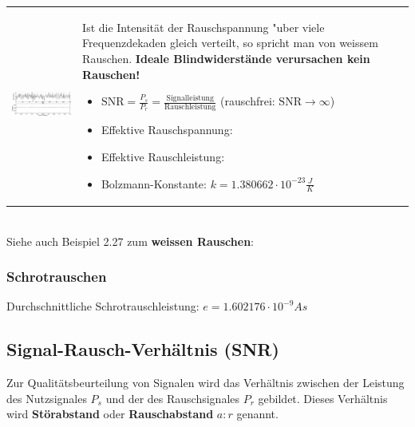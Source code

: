 		\begin{tabularx}{\textwidth}{lX}
			\parbox{8cm}{
				\includegraphics[width=8cm]{./bilder/rauschen2.png}
			} &
			\parbox{9.5cm}{
			Ist die Intensität der
			Rauschspannung "uber viele Frequenzdekaden
			gleich verteilt, so spricht man von weissem Rauschen.\\ \\
			\textbf{Ideale Blindwiderstände verursachen kein Rauschen!}
			\begin{itemize}
     			\item $\text{SNR} = \frac{P_s}{P_r} = \frac{\text{Signalleistung}}{\text{Rauschleistung}}$ (rauschfrei: $ \text{SNR} \rightarrow \infty$) 
     			\item Effektive Rauschspannung: 
     			\item Effektive Rauschleistung: 
     			\item Bolzmann-Konstante: $k =1.380662 \cdot 10^{-23}\frac{J}{K}$
   			\end{itemize}
			}
		\end{tabularx}\\
		
		Siehe auch Beispiel 2.27 zum \textbf{weissen Rauschen}: \skript{82}
		
		
		\subsubsection{Schrotrauschen \skript{28}}
		
		Durchschnittliche Schrotrauschleistung:  $e = 1.602176 \cdot 10^{-9} As$
		
	\subsection{Signal-Rausch-Verhältnis (SNR) }
	
		Zur Qualitätsbeurteilung von Signalen wird das Verhältnis zwischen der Leistung des Nutzsignales $P_s$ und der 
		des Rauschsignales $P_r$ gebildet. Dieses Verhältnis wird \textbf{Störabstand} oder \textbf{Rauschabstand} $a:r$ genannt.\\
	
